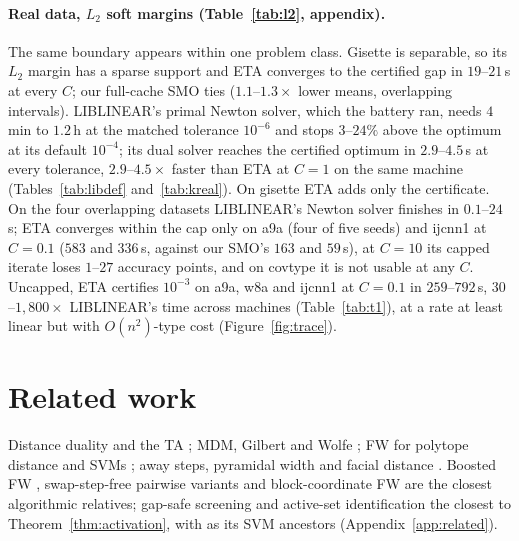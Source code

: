 \documentclass{opt2026}   %
\begin{document}
\paragraph{Real data, $L_2$ soft margins (Table~\ref{tab:l2}, appendix).}
The same boundary appears within one problem class. Gisette is
separable, so its $L_2$ margin has a sparse support and ETA converges to
the certified gap in $19$--$21$\,s at every $C$; our full-cache SMO ties
($1.1$--$1.3\times$ lower means, overlapping intervals). LIBLINEAR's
primal Newton solver, which the battery ran, needs $4$\,min to $1.2$\,h
at the matched tolerance $10^{-6}$ and stops $3$--$24\%$ above the
optimum at its default $10^{-4}$; its dual solver reaches the certified
optimum in $2.9$--$4.5$\,s at every tolerance, $2.9$--$4.5\times$ faster
than ETA at $C{=}1$ on the same machine (Tables~\ref{tab:libdef}
and~\ref{tab:kreal}). On gisette ETA adds only the certificate. On the four overlapping datasets LIBLINEAR's Newton solver finishes in
$0.1$--$24$\,s; ETA
converges within the cap only on a9a (four of five seeds) and ijcnn1 at
$C{=}0.1$ ($583$ and $336$\,s, against our SMO's $163$ and $59$\,s), at $C{=}10$ its
capped iterate loses $1$--$27$ accuracy points, and on covtype it is not
usable at any $C$. Uncapped, ETA certifies $10^{-3}$ on a9a, w8a and
ijcnn1 at $C{=}0.1$ in $259$--$792$\,s, $30$--$1{,}800\times$ LIBLINEAR's time across machines
(Table~\ref{tab:t1}), at a rate at least linear but with $O(n^2)$-type
cost (Figure~\ref{fig:trace}).

\section{Related work}
Distance duality and the TA \cite{kalantari2015,gupta2026}; MDM,
Gilbert and Wolfe \cite{mdm1974,lopez2015,gilbert1966,wolfe1976}; FW
for polytope distance and SVMs
\cite{gartner2009,clarkson2010,tsang2005,nanculef2014,keerthi2000,bennett2000duality};
away steps, pyramidal width and facial distance
\cite{guelat1986,lj2015,pena2019}. Boosted FW \cite{combettes2020}, swap-step-free pairwise variants \cite{tsuji2022,rinaldi2023} and block-coordinate FW
\cite{lacoste2013bcfw} are the closest algorithmic relatives; gap-safe
screening \cite{fercoq2015,ndiaye2017,shibagaki2016} and active-set
identification \cite{bomze2020,garber2020} the closest to
Theorem~\ref{thm:activation}, with \cite{elghaoui2012,ogawa2013,wang2014}
as its SVM ancestors (Appendix~\ref{app:related}).
\end{document}
